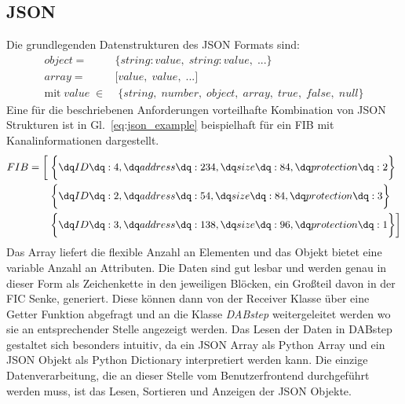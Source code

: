 \subsection{JSON}
Die grundlegenden Datenstrukturen des JSON Formats sind:
\begin{equation}
\begin{aligned}
object =& \biggl\{string : value,\;string : value,\; ...\biggl\} \\
array =& \biggl[value, \;value, \;...\biggl] \\
\text{mit} \; value \; \in& \; \{string,\; number,\; object,\; array,\; true,\; false,\; null\}
\end{aligned}
\end{equation}
Eine für die beschriebenen Anforderungen vorteilhafte Kombination von JSON Strukturen ist in Gl.~\ref{eq:json_example} beispielhaft für ein FIB mit Kanalinformationen dargestellt.
\begin{equation}
\label{eq:json_example}
\begin{aligned}
FIB = \biggl[
& \; \biggl \{ \text{\dq} ID \text{\dq} :4, \text{\dq} address \text{\dq} : 234, \text{\dq} size \text{\dq} : 84, \text{\dq} protection \text{\dq} : 2 \biggl \} \\
& \; \biggl\{\text{\dq}ID\text{\dq}:2,\text{\dq}address\text{\dq}:54,\text{\dq}size\text{\dq}:84,\text{\dq}protection\text{\dq}:3\biggl\} \\
& \; \biggl\{\text{\dq}ID\text{\dq}:3,\text{\dq}address\text{\dq}:138,\text{\dq}size\text{\dq}:96,\text{\dq}protection\text{\dq}:1\biggl\} \biggl]
\end{aligned}
\end{equation}
Das Array liefert die flexible Anzahl an Elementen und das Objekt bietet eine variable Anzahl an Attributen. Die Daten sind gut lesbar und werden genau in dieser Form als Zeichenkette in den jeweiligen Blöcken, ein Großteil davon in der FIC Senke, generiert. Diese können dann von der Receiver Klasse über eine Getter Funktion abgefragt und an die Klasse \textit{DABstep} weitergeleitet werden wo sie an entsprechender Stelle angezeigt werden. Das Lesen der Daten in DABstep gestaltet sich besonders intuitiv, da ein JSON Array als Python Array und ein JSON Objekt als Python Dictionary interpretiert werden kann. Die einzige Datenverarbeitung, die an dieser Stelle vom Benutzerfrontend durchgeführt werden muss, ist das Lesen, Sortieren und Anzeigen der JSON Objekte.

